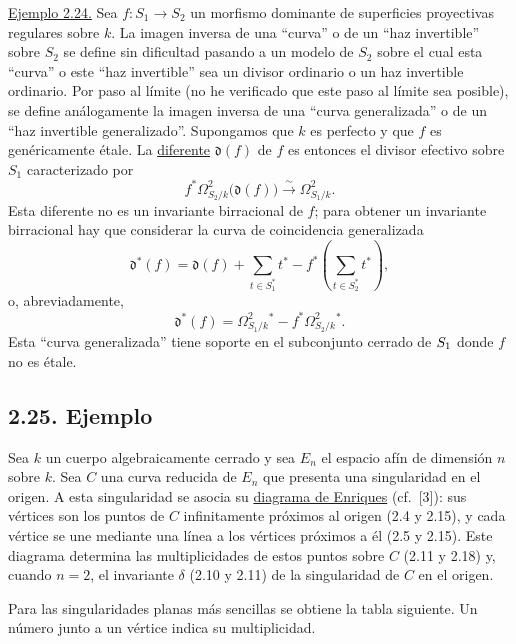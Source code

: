 \medskip
\noindent\underline{Ejemplo 2.24.}
Sea $f:S_1\longrightarrow S_2$ un morfismo dominante de superficies proyectivas
regulares sobre $k$. La imagen inversa de una ``curva'' o de un ``haz
invertible'' sobre $S_2$ se define sin dificultad pasando a un modelo de $S_2$
sobre el cual esta ``curva'' o este ``haz invertible'' sea un divisor ordinario
o un haz invertible ordinario. Por paso al límite (no he verificado que este paso
al límite sea posible), se define análogamente la imagen inversa de una ``curva
generalizada'' o de un ``haz invertible generalizado''. Supongamos que $k$ es
perfecto y que $f$ es genéricamente étale. La \underline{diferente}
$\mathfrak d(f)$ de $f$ es entonces el divisor efectivo sobre $S_1$
caracterizado por
\begin{equation*}
f^*\Omega^2_{S_2/k}\bigl(\mathfrak d(f)\bigr)
\overset{\sim}{\longrightarrow}\Omega^2_{S_1/k}.
\end{equation*}
Esta diferente no es un invariante birracional de $f$; para obtener un
invariante birracional hay que considerar la curva de coincidencia generalizada
\begin{equation*}
\mathfrak d^*(f)=\mathfrak d(f)+\sum_{t\in S_1^*}t^*
-f^*\left(\sum_{t\in S_2^*}t^*\right),
\end{equation*}
o, abreviadamente,
\begin{equation*}
\mathfrak d^*(f)=\Omega^2_{S_1/k}{}^*
-f^*\Omega^2_{S_2/k}{}^*.
\end{equation*}
Esta ``curva generalizada'' tiene soporte en el subconjunto cerrado de
$\sisi{S_2}{S_1}$ donde $f$ no es étale.

\pageoriginale

\subsection*{2.25. Ejemplo}

Sea $k$ un cuerpo algebraicamente cerrado y sea $E_n$ el espacio afín de
dimensión $n$ sobre $k$. Sea $C$ una curva reducida de $E_n$ que presenta una
singularidad en el origen. A esta singularidad se asocia su
\underline{diagrama de Enriques} (cf.~[3]): sus vértices son los puntos de $C$
infinitamente próximos al origen (2.4 y 2.15), y cada vértice se une mediante
una línea a los vértices próximos a él (2.5 y 2.15). Este diagrama determina las
multiplicidades de estos puntos sobre $C$ (2.11 y 2.18) y, cuando $n=2$, el
invariante $\delta$ (2.10 y 2.11) de la singularidad de $C$ en el origen.

Para las singularidades planas más sencillas se obtiene la tabla siguiente. Un
número junto a un vértice indica su multiplicidad.

